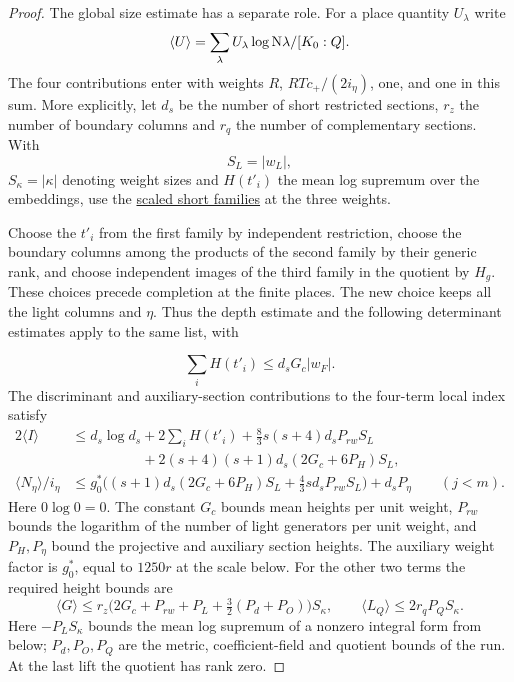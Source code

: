 \begin{proof}
The global size estimate has a separate role. For a place
quantity \(U_\lambda\) write 
\[
  \langle U\rangle=
\sum_\lambda U_\lambda\log {\rm N}\lambda/[K_0:Q].
\]
The four contributions enter with weights \(R\), \(RTc_+/(2i_\eta)\),
one, and one in this sum. More explicitly, let \(d_s\) be the
number of short restricted sections, \(r_z\) the number of
boundary columns and \(r_q\) the number of complementary
sections. With 
\[
  S_L=|w_L|,
\]
 \(S_\kappa=|\kappa|\) denoting
weight sizes and \(H(t'_i)\) the mean log supremum over the
embeddings, use the \hyperref[par:shifted-small]{scaled short
families} at the three weights.

Choose the \(t'_i\) from the
first family by independent restriction, choose the boundary
columns among the products of the second family by their generic
rank, and choose independent images of the third family in the
quotient by \(H_g\). These choices precede completion at the
finite places. The new choice keeps all the light columns and
\(\eta\). Thus the depth estimate and the following determinant
estimates apply to the same list, with

\[
  \sum_i H(t'_i)\le d_sG_c|w_F|.
\]
 The discriminant and auxiliary-section contributions to the four-term local index satisfy
\begin{equation}\label{eq:slice-branch-mean-bounds}\begin{aligned}
 2\langle I\rangle &\le d_s\log d_s+2\sum_i H(t'_i)
 +\tfrac83 s(s+4)d_s P_{rw} S_L\\
 &\hspace{5em}+2(s+4)(s+1)d_s(2G_c+6P_H) S_L,\\
 \langle N_\eta\rangle/i_\eta
 &\le g_0^*\big((s+1)d_s(2G_c+6P_H) S_L
              +\tfrac43 s d_s P_{rw} S_L\big)+d_sP_\eta
                      \qquad(j<m).
\end{aligned}\end{equation}
Here \(0\log0=0\). The constant \(G_c\) bounds mean heights per unit weight, \(P_{rw}\) bounds the logarithm of the number of light generators per unit weight, and \(P_H,P_\eta\) bound the projective and auxiliary section heights. The auxiliary weight factor is \(g_0^*\), equal to \(1250r\) at the scale below. For the other two terms the
required height bounds are
\[
 \langle G\rangle\le r_z\big(2G_c+P_{rw}+P_L
                    +\tfrac32(P_d+P_O)\big) S_\kappa,
 \qquad
 \langle L_Q\rangle\le 2r_q P_Q S_\kappa .
\]
Here \(-P_L S_\kappa\) bounds the mean log supremum of a
nonzero integral form from below; \(P_d,P_O,P_Q\) are the
metric, coefficient-field and quotient bounds of the run.
At the last lift the quotient has rank zero.


\end{proof}
